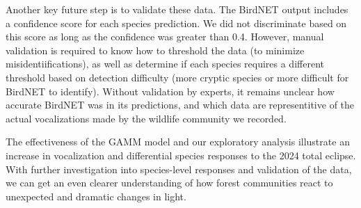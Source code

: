 \documentclass[
  letterpaper,
  DIV=11,
  numbers=noendperiod]{scrartcl}
\begin{document}
Another key future step is to validate these data. The BirdNET output
includes a confidence score for each species prediction. We did not
discriminate based on this score as long as the confidence was greater
than 0.4. However, manual validation is required to know how to
threshold the data (to minimize misidentiifications), as well as
determine if each species requires a different threshold based on
detection difficulty (more cryptic species or more difficult for BirdNET
to identify). Without validation by experts, it remains unclear how
accurate BirdNET was in its predictions, and which data are
representitive of the actual vocalizations made by the wildlife
community we recorded.

The effectiveness of the GAMM model and our exploratory analysis
illustrate an increase in vocalization and differential species
responses to the 2024 total eclipse. With further investigation into
species-level responses and validation of the data, we can get an even
clearer understanding of how forest communities react to unexpected and
dramatic changes in light.
\end{document}
